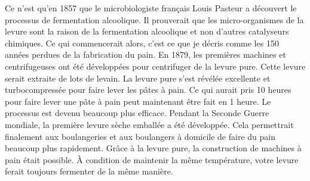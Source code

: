 Ce n'est qu'en 1857 que le microbiologiste français Louis Pasteur a découvert
le processus de fermentation alcoolique. Il prouverait que
les micro-organismes de la levure sont la raison de la fermentation alcoolique
et non d'autres catalyseurs chimiques. Ce qui commencerait alors,
c'est ce que je décris comme les 150 années perdues de la fabrication du pain. En 1879,
les premières machines et centrifugeuses ont été développées pour centrifuger
de la levure pure. Cette levure serait extraite de lots de levain.
La levure pure s'est révélée excellente et turbocompressée
pour faire lever les pâtes à pain. Ce qui aurait pris 10 heures
pour faire lever une pâte à pain peut maintenant être fait en 1 heure.
Le processus est devenu beaucoup plus efficace. Pendant la Seconde Guerre mondiale,
la première levure sèche emballée a été développée. Cela permettrait finalement
aux boulangeries et aux boulangers à domicile de faire du pain beaucoup plus rapidement.
Grâce à la levure pure, la construction de machines à pain était
possible. À condition de maintenir la même température,
votre levure ferait toujours fermenter de la même manière.

